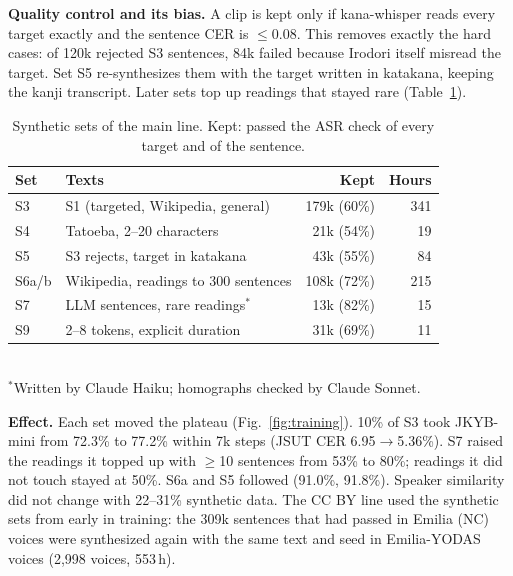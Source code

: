 \documentclass[10pt,a4paper,twocolumn]{article}
\begin{document}
\textbf{Quality control and its bias.} A clip is kept only if kana-whisper reads every target exactly
and the sentence CER is $\le$0.08. This removes exactly the hard cases: of 120k rejected S3
sentences, 84k failed because Irodori itself misread the target. Set S5 re-synthesizes them with the
target written in katakana, keeping the kanji transcript. Later sets top up readings that stayed rare
(Table~\ref{tab:synth}).

\begin{table}[t]
\centering\footnotesize\setlength{\tabcolsep}{3pt}
\caption{Synthetic sets of the main line. Kept: passed the ASR check of every target and of the
sentence.}
\label{tab:synth}
\begin{tabular}{@{}llrr@{}}
\toprule
Set & Texts & Kept & Hours\\
\midrule
S3 & S1 (targeted, Wikipedia, general) & 179k (60\%) & 341\\
S4 & Tatoeba, 2--20 characters & 21k (54\%) & 19\\
S5 & S3 rejects, target in katakana & 43k (55\%) & 84\\
S6a/b & Wikipedia, readings to 300 sentences & 108k (72\%) & 215\\
S7 & LLM sentences, rare readings$^\ast$ & 13k (82\%) & 15\\
S9 & 2--8 tokens, explicit duration & 31k (69\%) & 11\\
\bottomrule
\end{tabular}\\[2pt]
{\footnotesize $^\ast$Written by Claude Haiku; homographs checked by Claude Sonnet.}
\end{table}

\textbf{Effect.} Each set moved the plateau (Fig.~\ref{fig:training}). 10\% of S3 took JKYB-mini
from 72.3\% to 77.2\% within 7k steps (JSUT CER 6.95$\to$5.36\%). S7 raised the readings it topped up
with $\ge$10 sentences from 53\% to 80\%; readings it did not touch stayed at 50\%. S6a and S5
followed (91.0\%, 91.8\%). Speaker similarity did not change with 22--31\% synthetic data. The CC
BY line used the synthetic sets from early in training: the 309k sentences that had passed in Emilia
(NC) voices were synthesized again with the same text and seed in Emilia-YODAS voices (2,998 voices,
553\,h).
\end{document}
